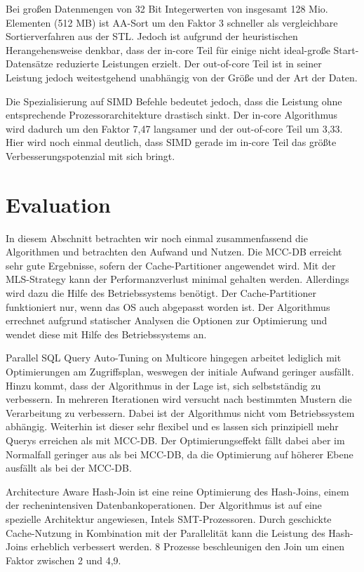Bei großen Datenmengen von 32 Bit Integerwerten von insgesamt 128 Mio. Elementen (512 MB) ist AA-Sort um den Faktor 3 schneller als vergleichbare Sortierverfahren aus der STL. Jedoch ist aufgrund der heuristischen Herangehensweise denkbar, dass der in-core Teil für einige nicht ideal-große Start-Datensätze reduzierte Leistungen erzielt. Der out-of-core Teil ist in seiner Leistung jedoch weitestgehend unabhängig von der Größe und der Art der Daten.

Die Spezialisierung auf SIMD Befehle bedeutet jedoch, dass die Leistung ohne entsprechende Prozessorarchitekture drastisch sinkt. Der in-core Algorithmus wird dadurch um den Faktor 7,47 langsamer und der out-of-core Teil um 3,33. Hier wird noch einmal deutlich, dass SIMD gerade im in-core Teil das größte Verbesserungspotenzial mit sich bringt.

\section{Evaluation}
\label{sec:Evaluation}
In diesem Abschnitt betrachten wir noch einmal zusammenfassend die Algorithmen und betrachten den Aufwand und Nutzen.
Die MCC-DB erreicht sehr gute Ergebnisse, sofern der Cache-Partitioner angewendet wird. Mit der MLS-Strategy kann der Performanzverlust minimal gehalten werden. Allerdings wird dazu die Hilfe des Betriebssystems benötigt. Der Cache-Partitioner funktioniert nur, wenn das OS auch abgepasst worden ist. Der Algorithmus errechnet aufgrund statischer Analysen die Optionen zur Optimierung und wendet diese mit Hilfe des Betriebssystems an.

Parallel SQL Query Auto-Tuning on Multicore hingegen arbeitet lediglich mit Optimierungen am Zugriffsplan, weswegen der initiale Aufwand geringer ausfällt. Hinzu kommt, dass der Algorithmus in der Lage ist, sich selbstständig zu verbessern. In mehreren Iterationen wird versucht nach bestimmten Mustern die Verarbeitung zu verbessern. Dabei ist der Algorithmus nicht vom Betriebssystem abhängig. Weiterhin ist dieser sehr flexibel und es lassen sich prinzipiell mehr Querys erreichen als mit MCC-DB. Der Optimierungseffekt fällt dabei aber im Normalfall geringer aus als bei MCC-DB, da die Optimierung auf höherer Ebene ausfällt als bei der MCC-DB.

Architecture Aware Hash-Join ist eine reine Optimierung des Hash-Joins, einem der rechenintensiven Datenbankoperationen. Der Algorithmus ist auf eine spezielle Architektur angewiesen, Intels SMT-Prozessoren. Durch geschickte Cache-Nutzung in Kombination mit der Parallelität kann die Leistung des Hash-Joins erheblich verbessert werden. 8 Prozesse beschleunigen den Join um einen Faktor zwischen 2 und 4,9. 

